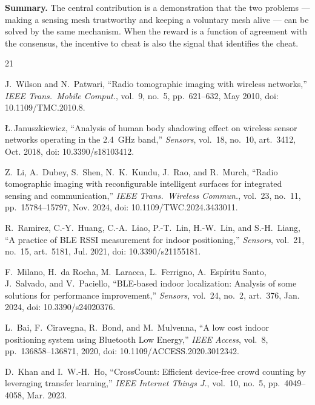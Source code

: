 \documentclass[journal,10pt]{IEEEtran}
\begin{document}
\textbf{Summary.} The central contribution is a demonstration that the two
problems --- making a sensing mesh trustworthy and keeping a voluntary mesh
alive --- can be solved by the same mechanism. When the reward is a function of
agreement with the consensus, the incentive to cheat is also the signal that
identifies the cheat.

\begin{thebibliography}{21}

 J.~Wilson and N.~Patwari, ``Radio tomographic imaging with
wireless networks,'' \emph{IEEE Trans.\ Mobile Comput.}, vol.~9, no.~5,
pp.~621--632, May 2010, doi: 10.1109/TMC.2010.8.

 {\L}.\,Januszkiewicz, ``Analysis of human body
shadowing effect on wireless sensor networks operating in the 2.4~GHz band,''
\emph{Sensors}, vol.~18, no.~10, art.~3412, Oct. 2018, doi: 10.3390/s18103412.

 Z.~Li, A.~Dubey, S.~Shen, N.~K.~Kundu, J.~Rao, and
R.~Murch, ``Radio tomographic imaging with reconfigurable intelligent surfaces
for integrated sensing and communication,'' \emph{IEEE Trans.\ Wireless
Commun.}, vol.~23, no.~11, pp.~15784--15797, Nov. 2024, doi:
10.1109/TWC.2024.3433011.

 R.~Ramirez, C.-Y.~Huang, C.-A.~Liao, P.-T.~Lin, H.-W.~Lin,
and S.-H.~Liang, ``A practice of BLE RSSI measurement for indoor positioning,''
\emph{Sensors}, vol.~21, no.~15, art.~5181, Jul. 2021, doi: 10.3390/s21155181.

 F.~Milano, H.~da Rocha, M.~Laracca, L.~Ferrigno,
A.~Esp\'iritu Santo, J.~Salvado, and V.~Paciello, ``BLE-based indoor
localization: Analysis of some solutions for performance improvement,''
\emph{Sensors}, vol.~24, no.~2, art.~376, Jan. 2024, doi: 10.3390/s24020376.

 L.~Bai, F.~Ciravegna, R.~Bond, and M.~Mulvenna, ``A low cost
indoor positioning system using Bluetooth Low Energy,'' \emph{IEEE Access},
vol.~8, pp.~136858--136871, 2020, doi: 10.1109/ACCESS.2020.3012342.

 D.~Khan and I.~W.-H.~Ho, ``CrossCount: Efficient device-free
crowd counting by leveraging transfer learning,'' \emph{IEEE Internet Things
J.}, vol.~10, no.~5, pp.~4049--4058, Mar. 2023.


\end{thebibliography}
\end{document}
